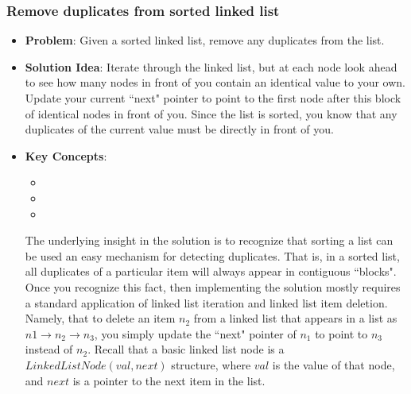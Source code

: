 \documentclass[10pt,a4paper]{article}
\begin{document}
\subsubsection*{Remove duplicates from sorted linked list}
\begin{itemize}
\item \textbf{Problem}: Given a sorted linked list, remove any duplicates from the list.
\item \textbf{Solution Idea}: Iterate through the linked list, but at each node look ahead to see how many nodes in front of you contain an identical value to your own. Update your current ``next" pointer to point to the first node after this block of identical nodes in front of you. Since the list is sorted, you know that any duplicates of the current value must be directly in front of you.
\item \textbf{Key Concepts}: 
\begin{itemize}
    \item {}
    \item {}
    \item {}
\end{itemize}
The underlying insight in the solution is to recognize that sorting a list can be used an easy mechanism for detecting duplicates. That is, in a sorted list, all duplicates of a particular item will always appear in contiguous ``blocks". Once you recognize this fact, then implementing the solution mostly requires a standard application of linked list iteration and linked list item deletion. Namely, that to delete an item $n_2$ from a linked list that appears in a list as $n1 \rightarrow n_2 \rightarrow n_3$, you simply update  the ``next" pointer of $n_1$ to point to $n_3$ instead of $n_2$. Recall that a basic linked list node is a $LinkedListNode(val, next)$ structure, where $val$ is the value of that node, and $next$ is a pointer to the next item in the list.
\end{itemize}
\end{document}
